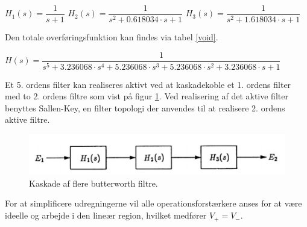\begin{center}
 $H_1(s) = \dfrac{1}{s+1}$ \hspace{1.5cm}
 $H_2(s) = \dfrac{1}{s^2 + 0.618034\cdot s + 1}$ \hspace{1.5cm}
 $H_3(s) = \dfrac{1}{s^2 + 1.618034\cdot s + 1}$
\end{center}

Den totale overføringsfunktion kan findes via tabel \ref{void}.\\ 
\begin{center}
 $H(s) = \dfrac{1}{s^5+3.236068\cdot s^4 + 5.236068\cdot s^3 + 5.236068\cdot s^2 + 3.236068\cdot s +1}$
\end{center}
Et 5. ordens filter kan realiseres aktivt ved at kaskadekoble et 1. ordens filter med to 2. ordens filtre som vist på figur  \ref{fig::anfilter_kask_butterworth}. Ved realisering af det aktive filter benyttes Sallen-Key, en filter topologi der anvendes til at realisere 2. ordens aktive filtre. 

\begin{figure}[h!]
	\centering
	\includegraphics[scale=0.7]{./billeder/Kaskade}
	\caption{Kaskade af flere butterworth filtre.}
	\label{fig::anfilter_kask_butterworth}
\end{figure}
\FloatBlock

For at simplificere udregningerne vil alle operationsforstærkere anses for at være ideelle og arbejde i den lineær region, hvilket medfører $V_+ = V_-$.

